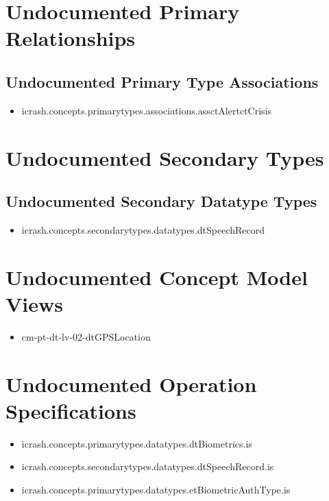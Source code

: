 \section[Undocumented Primary Type Relationships]{Undocumented Primary Relationships}

\subsection[Undocumented Primary Type Associations]{Undocumented Primary Type Associations}
\begin{itemize}
\item icrash.concepts.primarytypes.associations.assctAlertctCrisis 
\end{itemize}








\section[Undocumented Secondary Types]{Undocumented Secondary Types}


\subsection[Undocumented Secondary Datatype Types]{Undocumented Secondary Datatype Types}
\begin{itemize}
\item icrash.concepts.secondarytypes.datatypes.dtSpeechRecord 
\end{itemize}








\section[Undocumented Concept Model Views]{Undocumented Concept Model Views}
\begin{itemize}
\item cm-pt-dt-lv-02-dtGPSLocation 
\end{itemize}


\section[Undocumented Operation Specifications]{Undocumented Operation Specifications}
\begin{itemize}
\item icrash.concepts.primarytypes.datatypes.dtBiometrics.is 
\item icrash.concepts.secondarytypes.datatypes.dtSpeechRecord.is 
\item icrash.concepts.primarytypes.datatypes.etBiometricAuthType.is 
\end{itemize}





